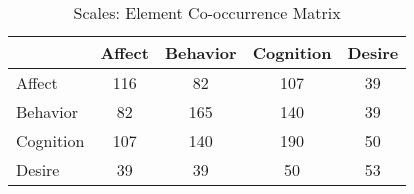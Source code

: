 \begin{table}
\begin{minipage}[t][\textheight][t]{\textwidth}

\caption{\label{tab:ScaleElementCooccurrences}Scales: Element Co-occurrence Matrix}
\begin{tabular}[t]{lcccc}
\toprule
  & Affect & Behavior & Cognition & Desire\\
\midrule
Affect & 116 & 82 & 107 & 39\\
Behavior & 82 & 165 & 140 & 39\\
Cognition & 107 & 140 & 190 & 50\\
Desire & 39 & 39 & 50 & 53\\
\bottomrule
\end{tabular}
\end{minipage}
\end{table}
